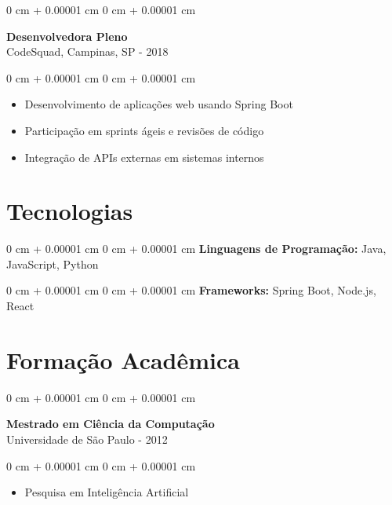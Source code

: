 \documentclass[10pt, letterpaper]{article}
\newenvironment{highlights}{
    \begin{itemize}[
        topsep=0.10 cm,
        parsep=0.10 cm,
        partopsep=0pt,
        itemsep=0pt,
        leftmargin=0 cm + 10pt
    ]
}{
    \end{itemize}
}
\newenvironment{onecolentry}{
    \begin{adjustwidth}{
        0 cm + 0.00001 cm
    }{
        0 cm + 0.00001 cm
    }
}{
    \end{adjustwidth}
}
\begin{document}
\vspace{0.2cm}

\begin{onecolentry}
    \setcolumnwidth{\fill, 4.5cm}
    \begin{paracol}{2}
        \textbf{Desenvolvedora Pleno} \\ CodeSquad, Campinas, SP
        \switchcolumn
         - 2018
    \end{paracol}
\end{onecolentry}
\vspace{0.10cm}
\begin{onecolentry}
    \begin{highlights}
                \item Desenvolvimento de aplicações web usando Spring Boot
                \item Participação em sprints ágeis e revisões de código
                \item Integração de APIs externas em sistemas internos
    \end{highlights}
\end{onecolentry}

\section{Tecnologias}
\begin{onecolentry}{\textbf{Linguagens de Programação:} Java, JavaScript, Python}\end{onecolentry}
\vspace{0.1cm}
\begin{onecolentry}{\textbf{Frameworks:} Spring Boot, Node.js, React}\end{onecolentry}
\section{Formação Acadêmica}

\begin{onecolentry}
    \setcolumnwidth{\fill, 4.5cm}
    \begin{paracol}{2}
        \textbf{Mestrado em Ciência da Computação} \\ Universidade de São Paulo
        \switchcolumn
         - 2012
    \end{paracol}
\end{onecolentry}
\vspace{0.10cm}
\begin{onecolentry}
    \begin{highlights}
                \item Pesquisa em Inteligência Artificial
    \end{highlights}
\end{onecolentry}
\end{document}
